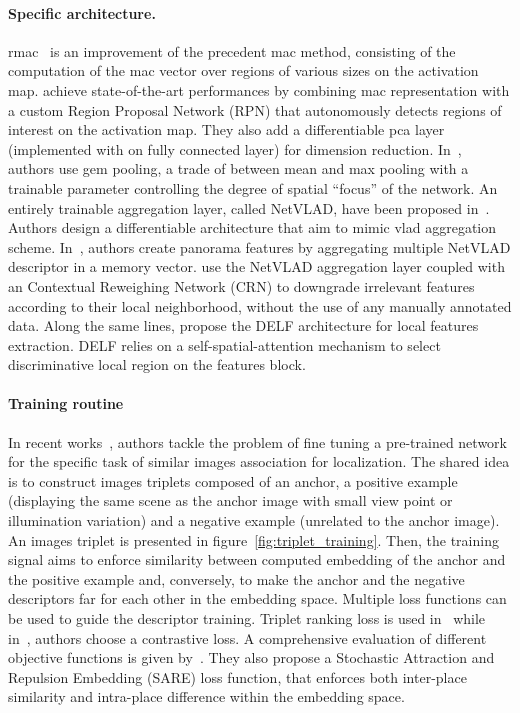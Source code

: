 \paragraph{Specific architecture.} \label{subsubsec:cnn_aggregation}
\ac{rmac}~\citep{Tolias2016} is an improvement of the precedent \ac{mac} method, consisting of the computation of the \ac{mac} vector over regions of various sizes on the activation map. \citet{Gordo2017} achieve state-of-the-art performances by combining \ac{mac} representation with a custom Region Proposal Network (RPN) that autonomously detects regions of interest on the activation map. They also add a differentiable \ac{pca} layer (implemented with on fully connected layer) for dimension reduction. In~\citep{Radenovic2017}, authors use \ac{gem} pooling, a trade of between mean and max pooling with a trainable parameter controlling the degree of spatial ``focus'' of the network. An entirely trainable aggregation layer, called NetVLAD, have been proposed in~\citep{Arandjelovic2017}. Authors design a differentiable architecture that aim to mimic \ac{vlad} aggregation scheme. In~\citep{Iscen2017}, authors create panorama features by aggregating multiple NetVLAD descriptor in a memory vector. \citet{Kim2017a} use the NetVLAD aggregation layer coupled with an Contextual Reweighing Network (CRN) to downgrade irrelevant features according to their local neighborhood, without the use of any manually annotated data. Along the same lines, \citet{Noh2017} propose the DELF architecture for local features extraction. DELF relies on a self-spatial-attention mechanism to select discriminative local region on the features block. 


\paragraph{Training routine}
In recent works~\citep{Arandjelovic2017,Radenovic2016, Gordo2016}, authors tackle the problem of fine tuning a pre-trained network for the specific task of similar images association for localization. The shared idea is to construct images triplets composed of an anchor, a positive example (displaying the same scene as the anchor image with small view point or illumination variation) and a negative example (unrelated to the anchor image). An images triplet is presented in figure~\ref{fig:triplet_training}. Then, the training signal aims to enforce similarity between computed embedding of the anchor and the positive example and, conversely, to make the anchor and the negative descriptors far for each other in the embedding space. Multiple loss functions can be used to guide the descriptor training. Triplet ranking loss is used in~\citep{Arandjelovic2017,Gordo2017} while in~\citep{Radenovic2016,Noh2017}, authors choose a contrastive loss. A comprehensive evaluation of different objective functions is given by~\citet{Liu2018}. They also propose a Stochastic Attraction and Repulsion Embedding (SARE) loss function, that enforces both inter-place similarity and intra-place difference within the embedding space. 

